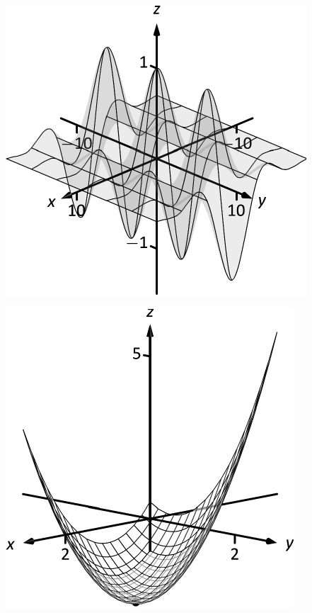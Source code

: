 \documentclass[10pt]{article}
\begin{document}
\includegraphics{figmulticont1_3DBW.pdf}
\texttt{}

\includegraphics{figmulti_extreme1_3DBW.pdf}
\texttt{}
\end{document}
